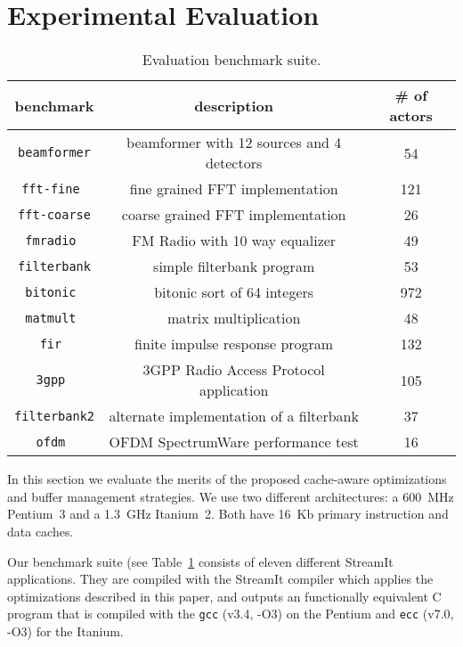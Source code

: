 \section{Experimental Evaluation}
\label{sec:evaluation}

\begin{table}[t]
\center
\label{tab:benchmarks}
\vspace{-12pt}
{\tiny
\begin{tabular}{|c|c|c|} \hline
{\bf benchmark}&{\bf description}&{\bf \# of actors}\\ \hline \hline
\texttt{beamformer} &beamformer with 12 sources and 4 detectors& 54 \\ \hline
\texttt{fft-fine	} &fine grained FFT implementation	&	121 \\ \hline
\texttt{fft-coarse} &coarse grained FFT implementation	&	26 \\ \hline
\texttt{fmradio	} &FM Radio with 10 way equalizer	&	49 \\ \hline
\texttt{filterbank} &simple filterbank program	&	53 \\ \hline
\texttt{bitonic	} &bitonic sort of 64 integers	&	972 \\ \hline
\texttt{matmult	} &matrix multiplication	&	48 \\ \hline
\texttt{fir	      } &finite impulse response program	&	132 \\ \hline
\texttt{3gpp	} &3GPP Radio Access Protocol application	&	105 \\ \hline
\texttt{filterbank2}&alternate implementation of a filterbank &	37 \\ \hline
\texttt{ofdm	 }&OFDM SpectrumWare performance test	&	16 \\ \hline
\end{tabular}
}
\vspace{-12pt}
\caption{Evaluation benchmark suite.}
\end{table}


In this section we evaluate the merits of the proposed cache-aware
optimizations and buffer management strategies. We use two
different architectures: a 600~MHz Pentium~3 and a 1.3~GHz
Itanium~2. Both have 16~Kb primary instruction and data caches.

Our benchmark suite (see Table~\ref{tab:benchmarks} consists of eleven
different StreamIt applications. They are compiled with the StreamIt
compiler which applies the optimizations described in this paper, and
outputs an functionally equivalent C program that is compiled with the
\texttt{gcc} (v3.4, -O3) on the Pentium and \texttt{ecc} 
(v7.0, -O3) for the Itanium.


